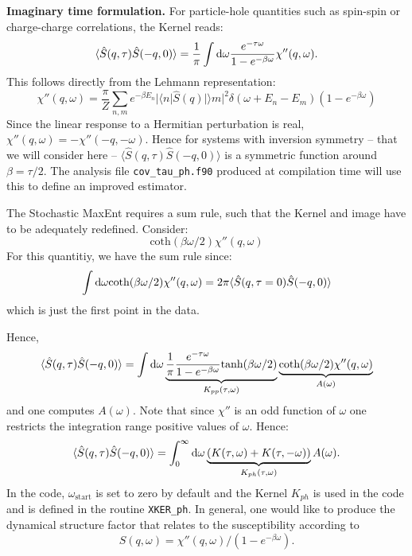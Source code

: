 \noindent
\textbf{Imaginary time formulation.}
 For particle-hole quantities such as spin-spin or charge-charge correlations, 
the  Kernel reads:
\begin{equation}
	\langle \hat{S}(q,\tau) \hat{S}(-q,0) \rangle  = \frac{1}{\pi} 
   \int {\text d} \omega  \frac{e^{- \tau \omega} }{ 1 - e^{-\beta  \omega} } \chi''(q,\omega).
\end{equation}
This follows directly from the  Lehmann representation: 
\begin{equation}
 \chi''(q,\omega)  = \frac{\pi}{Z} \sum_{n,m} e^{-\beta E_n} |\langle n | \hat{S}(q) | \rangle m |^2 
\delta ( \omega + E_n - E_m) \left( 1 - e^{-\beta  \omega} \right) 
\end{equation}
Since the linear response to a Hermitian perturbation  is real, $\chi''(q,\omega)  = - \chi''(-q,-\omega)$.  Hence for systems with inversion symmetry -- that 
we will consider here -- $\langle \hat{S}(q,\tau) \hat{S}(-q,0) \rangle $ is a symmetric function around $\beta= \tau/2$.  The analysis  file \texttt{cov\_tau\_ph.f90} produced at compilation
time will use this  to define an improved estimator. 

The  Stochastic MaxEnt requires a sum rule, such that   the Kernel and image have to be adequately redefined. 
Consider: 
\begin{equation}
	\text{coth}(\beta \omega/2) \chi''(q,\omega)
\end{equation}
For this quantitiy, we have the sum rule since: 
\begin{equation}
	\int {\text d} \omega 	\text{coth}(\beta \omega/2) \chi''(q,\omega) = 
  2 \pi \langle \hat{S}(q,\tau=0) \hat{S}(-q,0) \rangle
\end{equation}
which is just the first point in the data. 

Hence,
\begin{equation}
	\langle \hat{S}(q,\tau) \hat{S}(-q,0) \rangle  =  
       \int {\text d} \omega  \underbrace{ \frac{1}{\pi} \frac{e^{- \tau \omega} }
            { 1 - e^{-\beta  \omega} } \text{tanh}(\beta \omega/2)  }_{K_{pp}(\tau,\omega)} 
       \underbrace{ \text{coth}(\beta \omega/2)   \chi''(q,\omega) }_{A(\omega)} 
\label{Kpp.eq}
\end{equation}
and one  computes $A(\omega)$. Note that since $\chi'' $ is an odd function of $\omega$  one restricts the integration range  positive values of $\omega$. 
Hence: 
\begin{equation}
	\langle \hat{S}(q,\tau) \hat{S}(-q,0) \rangle  =  
       \int_{0}^{\infty}  {\text d} \omega \underbrace{\left( K(\tau,\omega)  + K(\tau,-\omega) \right)}_{K_{ph}(\tau,\omega)}  A(\omega).
\end{equation}
In the code, $\omega_\text{start}$ is set to zero by default and the Kernel $K_{ph}$ is used in the code and is defined in the  routine \texttt{XKER\_ph}. 
In general,  one would like to produce the  dynamical structure factor that relates to the susceptibility according to
\begin{equation}
 S(q,\omega)  = \chi''(q,\omega)/\left( 1 - e^{-\beta  \omega} \right). 
\end{equation}


